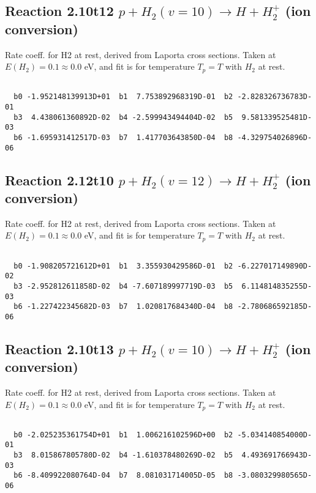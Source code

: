 \documentclass[12pt,dvipdfmx]{article}
\begin{document}
\newpage
\subsection{
Reaction 2.10t12
$ p + H_2(v=10) \rightarrow H + H_2^+$ (ion conversion)
}
Rate coeff. for H2 at rest, derived from Laporta cross sections.
Taken at $E(H_2) = 0.1 \approx 0.0$ eV,  and fit is for temperature $T_p=T$ with $H_2$ at rest.

\begin{small}\begin{verbatim}

  b0 -1.952148139913D+01  b1  7.753892968319D-01  b2 -2.828326736783D-01
  b3  4.438061360892D-02  b4 -2.599943494404D-02  b5  9.581339525481D-03
  b6 -1.695931412517D-03  b7  1.417703643850D-04  b8 -4.329754026896D-06

\end{verbatim}\end{small}

\newpage
\subsection{
Reaction 2.12t10
$ p + H_2(v=12) \rightarrow H + H_2^+$ (ion conversion)
}
Rate coeff. for H2 at rest, derived from Laporta cross sections.
Taken at $E(H_2) = 0.1 \approx 0.0$ eV,  and fit is for temperature $T_p=T$ with $H_2$ at rest.

\begin{small}\begin{verbatim}

  b0 -1.908205721612D+01  b1  3.355930429586D-01  b2 -6.227017149890D-02
  b3 -2.952812611858D-02  b4 -7.607189997719D-03  b5  6.114814835255D-03
  b6 -1.227422345682D-03  b7  1.020817684340D-04  b8 -2.780686592185D-06

\end{verbatim}\end{small}

\newpage
\subsection{
Reaction 2.10t13
$ p + H_2(v=10) \rightarrow H + H_2^+$ (ion conversion)
}
Rate coeff. for H2 at rest, derived from Laporta cross sections.
Taken at $E(H_2) = 0.1 \approx 0.0$ eV,  and fit is for temperature $T_p=T$ with $H_2$ at rest.

\begin{small}\begin{verbatim}

  b0 -2.025235361754D+01  b1  1.006216102596D+00  b2 -5.034140854000D-01
  b3  8.015867805780D-02  b4 -1.610378480269D-02  b5  4.493691766943D-03
  b6 -8.409922080764D-04  b7  8.081031714005D-05  b8 -3.080329980565D-06

\end{verbatim}\end{small}
\end{document}
